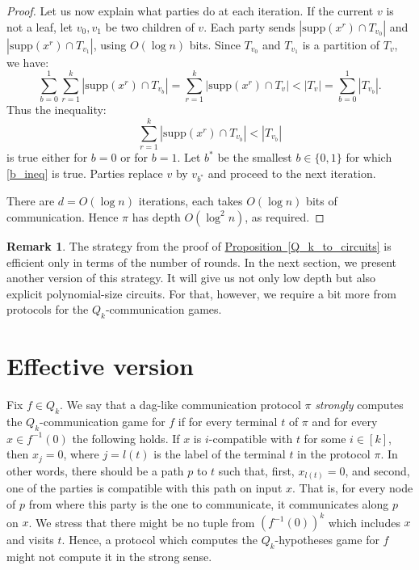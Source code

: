 \documentclass[11pt]{article}
\numberwithin{equation}{section}
\theoremstyle{definition}
\newtheorem{remark}[theorem]{Remark}
\theoremstyle{plain}
\newcommand{\expref}[2]{\hyperref[#2]{#1~\ref{#2}}}
\begin{document}
\begin{proof}
Let us now explain what parties do at each iteration. If the current $v$ is not a leaf,  let $v_0, v_1$ be two children of $v$. Each party sends $\left|\mathrm{supp}(x^r) \cap T_{v_0}\right|$ and $\left|\mathrm{supp}(x^r) \cap T_{v_1}\right|$, using $O(\log n)$ bits. Since $T_{v_0}$ and $T_{v_1}$ is a partition of $T_v$, we have:
\[
 \sum\limits_{b = 0}^1 \sum\limits_{r = 1}^k \left|\mathrm{supp}(x^r) \cap T_{v_b}\right| = \sum\limits_{r = 1}^k \left|\mathrm{supp}(x^r) \cap T_v\right| < |T_v| = \sum\limits_{b = 0}^1 |T_{v_b}|.
\]
Thus the inequality:
\begin{equation}
\label{b_ineq}
\sum\limits_{r = 1}^k \left|\mathrm{supp}(x^r) \cap T_{v_b}\right| < |T_{v_b}|
\end{equation}
is true either for $b = 0$ or for $b = 1$. Let $b^*$ be the smallest $b\in\{0, 1\}$ for which \eqref{b_ineq} is true. Parties replace $v$ by $v_{b^*}$ and proceed to the next iteration.

There are $d = O(\log n)$ iterations, each takes $O(\log n)$ bits of communication. Hence $\pi$
%
has depth $O(\log^2 n)$, as required. %
\end{proof}



\begin{remark}
The strategy from the proof of \expref{Proposition}{Q_k_to_circuits} is efficient only in terms of the number of rounds. 
In the next section, we present another version of this strategy. 
It will give us not only %
low depth  %
but also explicit polynomial-size circuits.  For that, however, we require a bit more from protocols for the $Q_k$-communication games. 
\end{remark}


 


\section{Effective version} \label{sec:effective}

Fix $f\in Q_k$. We say that a dag-like communication protocol $\pi$ \emph{strongly} computes the $Q_k$-communication game for $f$ if for every terminal $t$ of $\pi$ and for every $x\in f^{-1}(0)$ the following holds. If $x$ is $i$-compatible with $t$ for some $i\in[k]$, then $x_j = 0$, where $j = l(t)$ is the label of the terminal $t$ in the protocol $\pi$. In other words, there should be a  path $p$ to $t$ such that, first, $x_{l(t)} = 0$, and second, one of the parties is  compatible with this path on input $x$. That is, for every node of $p$ from where this party is the one to communicate, it communicates along $p$ on $x$. We stress that there might be no tuple from $(f^{-1}(0))^k$ which includes $x$ and visits $t$. Hence, a protocol which computes the $Q_k$-hypotheses game for $f$ might not compute it in the strong sense. 
\end{document}
